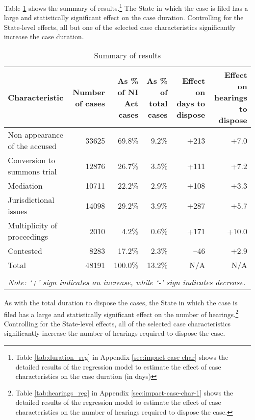 Table \ref{tab:summary_results} shows the summary of results.\footnote{Table \ref{tab:duration_reg} in Appendix \ref{sec:impact-case-char} shows the detailed results of the regression model to estimate the effect of case characteristics on the case duration (in days)} The State in which the case is filed has a large and statistically significant effect on the case duration. Controlling for the State-level effects, all but one of the selected case characteristics significantly increase the case duration.

{\footnotesize \begin{longtable}{@{}p{2.5cm}rrrrr}
 \caption{Summary of results}\label{tab:summary_results}\\
 \toprule
 \textbf{Characteristic} & \multicolumn{1}{p{2cm}}{\textbf{Number of cases}} &
 \multicolumn{1}{p{2cm}}{\textbf{As \% of NI Act cases}}
 & \multicolumn{1}{p{2cm}}{\textbf{As \% of total cases}}
 & \multicolumn{1}{p{2cm}}{\textbf{Effect on days to dispose}} &
 \multicolumn{1}{p{2cm}}{\textbf{Effect on hearings to dispose}}
 \\
 \midrule
 Non appearance of the accused & 33625 & 69.8\% & 9.2\% & +213 & +7.0 \\ \midrule
 Conversion to summons trial & 12876 & 26.7\% & 3.5\% & +111 & +7.2 \\ \midrule
 Mediation & 10711 & 22.2\% & 2.9\% & +108 & +3.3 \\ \midrule
 Jurisdictional issues & 14098 & 29.2\% & 3.9\% & +287 & +5.7 \\ \midrule
 Multiplicity of proceedings & 2010 & 4.2\% & 0.6\% & +171 & +10.0 \\ \midrule
 Contested & 8283 & 17.2\% & 2.3\% & --46 & +2.9 \\ \midrule
 Total & 48191 & 100.0\% & 13.2\% & N/A & N/A \\
 \bottomrule
 \\
 \multicolumn{6}{l}{{\footnotesize \emph{Note: `+' sign
  indicates an increase, while `-' sign indicates decrease.}}}\\
\end{longtable}
}

As with the total duration to dispose the cases, the State in which the case is filed has a large and statistically significant effect on the number of hearings.\footnote{Table \ref{tab:hearings_reg} in Appendix \ref{sec:impact-case-char-1} shows the detailed results of the regression model to estimate the effect of case characteristics on the number of hearings required to dispose the case.} Controlling for the State-level effects, all of the selected case characteristics significantly increase the number of hearings required to dispose the case.

